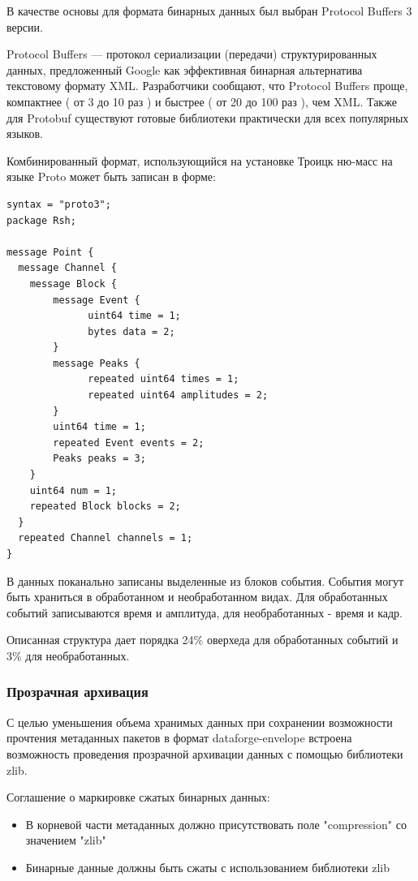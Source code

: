 \documentclass[a4paper,14pt]{extreport}
\begin{document}
В качестве основы для формата бинарных данных был выбран Protocol Buffers 3 версии\cite{protobuf}.

Protocol Buffers — протокол сериализации (передачи) структурированных данных, предложенный Google как эффективная бинарная альтернатива текстовому формату XML. Разработчики сообщают, что Protocol Buffers проще, компактнее ( от 3 до 10 раз )  и быстрее ( от 20 до 100 раз ), чем XML. Также для Protobuf существуют готовые библиотеки практически для всех популярных языков.

Комбинированный формат, использующийся на установке Троицк ню-масс на языке Proto может быть записан в форме:

\begin{lstlisting}[language=protobuf3,style=protobuf]
syntax = "proto3";
package Rsh;

message Point {
  message Channel {
    message Block {
        message Event {
              uint64 time = 1; 
              bytes data = 2;
        }
        message Peaks {
              repeated uint64 times = 1;
              repeated uint64 amplitudes = 2;
        }
        uint64 time = 1;
        repeated Event events = 2;
        Peaks peaks = 3;
    }
    uint64 num = 1;
    repeated Block blocks = 2;
  }
  repeated Channel channels = 1;
}
\end{lstlisting}
В данных поканально записаны выделенные из блоков события. События могут быть храниться в обработанном и необработанном видах. Для обработанных событий записываются время и амплитуда, для необработанных - время и кадр. 

Описанная структура дает порядка 24\% оверхеда для обработанных событий и 3\% для необработанных.

\subsubsection{Прозрачная архивация}
С целью уменьшения объема хранимых данных при сохранении возможности прочтения метаданных пакетов в формат dataforge-envelope встроена возможность проведения прозрачной архивации данных с помощью библиотеки zlib.

Соглашение о маркировке сжатых бинарных данных:
\begin{itemize}
    \item В корневой части метаданных должно присутствовать поле "compression" со значением "zlib"
    \item Бинарные данные должны быть сжаты с использованием библиотеки zlib
\end{itemize}
\end{document}

